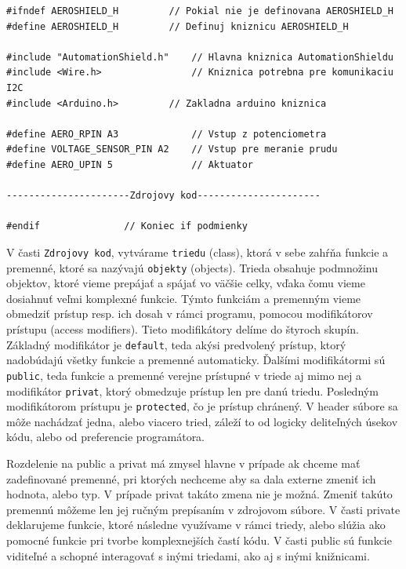 \begin{lstlisting}[caption={Ukážka zdrojového kódu headeru.},captionpos=b]
#ifndef AEROSHIELD_H	 	 // Pokial nie je definovana AEROSHIELD_H
#define AEROSHIELD_H	 	 // Definuj kniznicu AEROSHIELD_H

#include "AutomationShield.h"    // Hlavna kniznica AutomationShieldu
#include <Wire.h>                // Kniznica potrebna pre komunikaciu I2C
#include <Arduino.h>		 // Zakladna arduino kniznica

#define AERO_RPIN A3             // Vstup z potenciometra
#define VOLTAGE_SENSOR_PIN A2    // Vstup pre meranie prudu 
#define AERO_UPIN 5              // Aktuator

----------------------Zdrojovy kod----------------------

#endif			   	 // Koniec if podmienky 
\end{lstlisting}



V časti \verb|Zdrojovy kod|, vytvárame \verb|triedu| (class), ktorá v sebe zahŕňa funkcie a premenné, ktoré sa nazývajú \verb|objekty| (objects). Trieda obsahuje podmnožinu objektov, ktoré vieme prepájať a spájať vo väčšie celky, vďaka čomu vieme dosiahnuť veľmi komplexné funkcie. Týmto funkciám a premenným vieme obmedziť prístup resp. ich dosah v rámci programu, pomocou modifikátorov prístupu (access modifiers). Tieto modifikátory delíme do štyroch skupín. Základný modifikátor je \verb|default|, teda akýsi predvolený prístup, ktorý nadobúdajú všetky funkcie a premenné automaticky. Ďalšími modifikátormi sú \verb|public|, teda funkcie a premenné verejne prístupné v triede aj mimo nej a modifikátor \verb|privat|, ktorý obmedzuje prístup len pre danú triedu. Posledným modifikátorom prístupu je \verb|protected|, čo je prístup chránený. V header súbore sa môže nachádzať jedna, alebo viacero tried, záleží to od logicky deliteľných úsekov kódu, alebo od preferencie programátora. 

Rozdelenie na public a privat má zmysel hlavne v prípade ak chceme mať zadefinované premenné, pri ktorých nechceme aby sa dala externe zmeniť ich hodnota, alebo typ. V prípade privat takáto zmena nie je možná. Zmeniť takúto premennú môžeme len jej ručným prepísaním v zdrojovom súbore. V časti private deklarujeme funkcie, ktoré následne využívame v rámci triedy, alebo slúžia ako pomocné funkcie pri tvorbe komplexnejších častí kódu. V časti public sú funkcie viditeľné a schopné interagovať s inými triedami, ako aj s inými knižnicami. 


